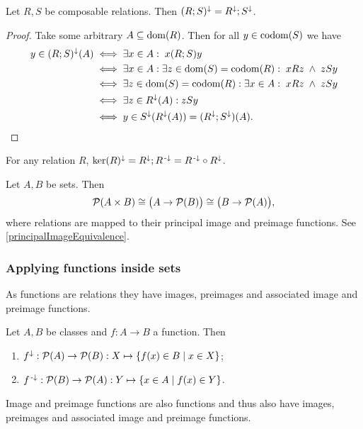 \begin{lemma} \label{functorialityImageFunction}
Let $R,S$ be composable relations. Then $(R;S)^\downarrow = R^\downarrow;S^\downarrow$.
\end{lemma}
\begin{proof}
Take some arbitrary $A\subseteq \operatorname{dom}(R)$. Then for all $y\in \operatorname{codom}(S)$ we have
\begin{align*}
y \in (R;S)^\downarrow(A) &\iff \exists x\in A:\; x(R;S)y \\
&\iff \exists x\in A:\exists z\in \operatorname{dom}(S) = \operatorname{codom}(R): \; xRz\;\wedge\; zSy \\
&\iff \exists z\in \operatorname{dom}(S) = \operatorname{codom}(R):\exists x\in A: \; xRz\;\wedge\; zSy \\
&\iff \exists z\in R^\downarrow(A): zSy \\
&\iff y\in S^\downarrow(R^\downarrow(A)) = (R^\downarrow;S^\downarrow)(A).
\end{align*}
\end{proof}
\begin{corollary}
For any relation $R$, $\ker(R)^\downarrow = R^\downarrow;R^{\text{\hspace{0.15em}-}\downarrow} = R^{\text{\hspace{0.15em}-}\downarrow}\circ R^\downarrow$.
\end{corollary}


\begin{note}
Let $A,B$ be sets. Then
\[ \operatorname{\mathcal{P}}(A\times B) \cong \big(A\to \operatorname{\mathcal{P}}(B)\big) \cong \big(B\to \operatorname{\mathcal{P}}(A)\big), \]
where relations are mapped to their principal image and preimage functions. See \ref{principalImageEquivalence}.
\end{note}




\subsubsection{Applying functions inside sets}
As functions are relations they have images, preimages and associated image and preimage functions.

\begin{lemma}
Let $A,B$ be classes and $f:A\to B$ a function. Then
\begin{enumerate}
\item $f^{\imf}: \powerset(A) \to \powerset(B): X\mapsto \setbuilder{f(x)\in B}{x\in X}$;
\item $f^{\preimf}: \powerset(B) \to \powerset(A): Y\mapsto \setbuilder{x\in A}{f(x) \in Y}$.
\end{enumerate}
\end{lemma}

Image and preimage functions are also functions and thus also have images, preimages and associated image and preimage functions.


